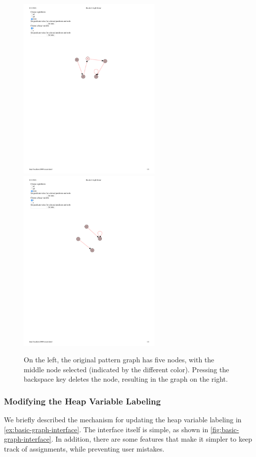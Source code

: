 \begin{figure}
  \centering
  \includegraphics[width=7cm]{fig/nodes-original.pdf}
  \includegraphics[width=7cm]{fig/nodes-changed.pdf}
  \caption{On the left, the original pattern graph has five nodes, with the middle node selected (indicated by the different color). Pressing the backspace key deletes the node, resulting in the graph on the right.
  }
  \label{fig:modifying-nodes}
\end{figure}

\subsubsection{Modifying the Heap Variable Labeling}
We briefly described the mechanism for updating the heap variable labeling in \autoref{ex:basic-graph-interface}. The interface itself is simple, as shown in \autoref{fig:basic-graph-interface}. In addition, there are some features that make it simpler to keep track of assignments, while preventing user mistakes.

